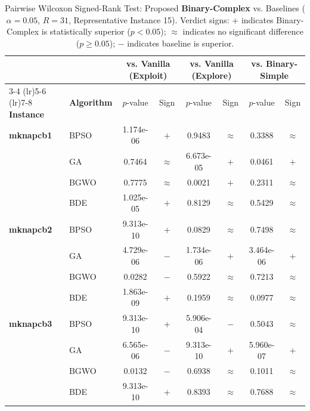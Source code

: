 \begin{table}[htbp]
  \centering
  \small
  \caption{Pairwise Wilcoxon Signed-Rank Test: Proposed \textbf{Binary-Complex} vs. Baselines ($\alpha=0.05$, $R=31$, Representative Instance 15). Verdict signs: $+$ indicates Binary-Complex is statistically superior ($p < 0.05$); $\approx$ indicates no significant difference ($p \ge 0.05$); $-$ indicates baseline is superior.}
  \label{tab:wilcoxon_inst15}
  \begin{tabular*}{\textwidth}{@{\extracolsep{\fill}}llcccccc@{}}
    \toprule
    & & \multicolumn{2}{c}{\textbf{vs. Vanilla (Exploit)}} & \multicolumn{2}{c}{\textbf{vs. Vanilla (Explore)}} & \multicolumn{2}{c}{\textbf{vs. Binary-Simple}} \\
    \cmidrule(lr){3-4} \cmidrule(lr){5-6} \cmidrule(lr){7-8}
    \textbf{Instance} & \textbf{Algorithm} & $p$-value & Sign & $p$-value & Sign & $p$-value & Sign \\
    \midrule
    \textbf{mknapcb1}  & BPSO  & 1.174e-06 & $+$ &    0.9483 & $\approx$ &    0.3388 & $\approx$ \\
                       & GA    &    0.7464 & $\approx$ & 6.673e-05 & $+$ &    0.0461 & $+$ \\
                       & BGWO  &    0.7775 & $\approx$ &    0.0021 & $+$ &    0.2311 & $\approx$ \\
                       & BDE   & 1.025e-05 & $+$ &    0.8129 & $\approx$ &    0.5429 & $\approx$ \\
    \midrule
    \textbf{mknapcb2}  & BPSO  & 9.313e-10 & $+$ &    0.0829 & $\approx$ &    0.7498 & $\approx$ \\
                       & GA    & 4.729e-06 & $-$ & 1.734e-06 & $+$ & 3.464e-06 & $+$ \\
                       & BGWO  &    0.0282 & $-$ &    0.5922 & $\approx$ &    0.7213 & $\approx$ \\
                       & BDE   & 1.863e-09 & $+$ &    0.1959 & $\approx$ &    0.0977 & $\approx$ \\
    \midrule
    \textbf{mknapcb3}  & BPSO  & 9.313e-10 & $+$ & 5.906e-04 & $-$ &    0.5043 & $\approx$ \\
                       & GA    & 6.565e-06 & $-$ & 9.313e-10 & $+$ & 5.960e-07 & $+$ \\
                       & BGWO  &    0.0132 & $-$ &    0.6938 & $\approx$ &    0.1011 & $\approx$ \\
                       & BDE   & 9.313e-10 & $+$ &    0.8393 & $\approx$ &    0.7688 & $\approx$ \\

\end{tabular*}
\end{table}
